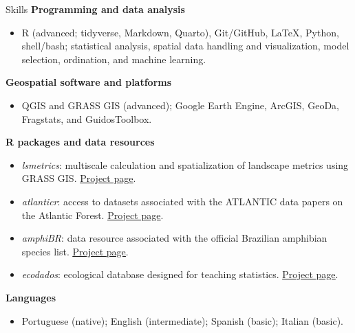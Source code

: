 \documentclass{resume}
\begin{document}
\begin{rSection}{Skills}
\textbf{Programming and data analysis}
\begin{itemize}
\item R (advanced; tidyverse, Markdown, Quarto), Git/GitHub, LaTeX, Python, shell/bash; statistical analysis, spatial data handling and visualization, model selection, ordination, and machine learning.
\end{itemize}

\textbf{Geospatial software and platforms}
\begin{itemize}
\item QGIS and GRASS GIS (advanced); Google Earth Engine, ArcGIS, GeoDa, Fragstats, and GuidosToolbox.
\end{itemize}

\textbf{R packages and data resources}
\begin{itemize}
\item \textit{lsmetrics}: multiscale calculation and spatialization of landscape metrics using GRASS GIS. \href{https://mauriciovancine.github.io/lsmetrics}{\underline{Project page}}.
\item \textit{atlanticr}: access to datasets associated with the ATLANTIC data papers on the Atlantic Forest. \href{https://mauriciovancine.github.io/atlanticr}{\underline{Project page}}.
\item \textit{amphiBR}: data resource associated with the official Brazilian amphibian species list. \href{https://paulobarros.github.io/amphiBR}{\underline{Project page}}.
\item \textit{ecodados}: ecological database designed for teaching statistics. \href{https://paternogbc.github.io/ecodados/}{\underline{Project page}}.
\end{itemize}

\textbf{Languages}
\begin{itemize}
\item Portuguese (native); English (intermediate); Spanish (basic); Italian (basic).
\end{itemize}
\end{rSection}
\end{document}
